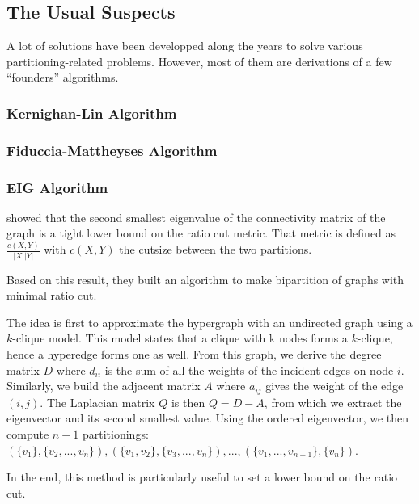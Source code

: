 \documentclass[11pt,a4paper]{article}
\theoremstyle{customdef}
\begin{document}
\subsection{The Usual Suspects}
A lot of solutions have been developped along the years to solve various partitioning-related problems.
However, most of them are derivations of a few “founders” algorithms.

\subsubsection{Kernighan-Lin Algorithm~\citep*{Kernighan1970}}

\subsubsection{Fiduccia-Mattheyses Algorithm~\citep*{Fiduccia1982}}

\subsubsection{EIG Algorithm~\citep*{Hagen1992}}
\citet{Hagen1992} showed that the second smallest eigenvalue of the connectivity matrix of the graph is a tight lower bound on the ratio cut metric.
That metric is defined as $\frac{c(X,Y)}{|X||Y|}$ with $c(X, Y)$ the cutsize between the two partitions.

Based on this result, they built an algorithm to make bipartition of graphs with minimal ratio cut.

The idea is first to approximate the hypergraph with an undirected graph using a $k$-clique model.
This model states that a clique with k nodes forms a $k$-clique, hence a hyperedge forms one as well.
From this graph, we derive the degree matrix $D$ where  $d_{ii}$ is the sum of all the weights of the incident edges on node $i$.
Similarly, we build the adjacent matrix $A$ where $a_{ij}$ gives the weight of the edge $(i, j)$.
The Laplacian matrix $Q$ is then $Q = D - A$, from which we extract the eigenvector and its second smallest value.
Using the ordered eigenvector, we then compute $n-1$ partitionings: $(\{v_1\}, \{v_2, ..., v_n\}), (\{v_1, v_2\}, \{v_3, ..., v_n\}), ..., (\{v_1, ..., v_{n-1}\}, \{v_n\})$.

In the end, this method is particularly useful to set a lower bound on the ratio cut.
\end{document}
